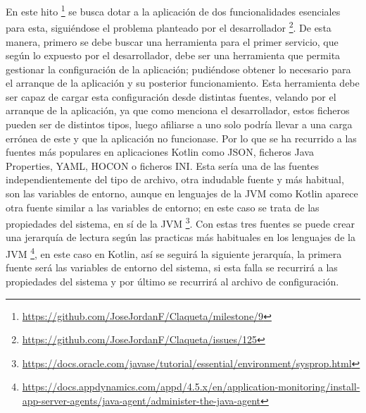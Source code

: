 En este hito \footnote{\url{https://github.com/JoseJordanF/Claqueta/milestone/9}} se busca dotar a la aplicación de
dos funcionalidades esenciales para esta, siguiéndose el problema planteado por el desarrollador 
\footnote{\url{https://github.com/JoseJordanF/Claqueta/issues/125}}. De esta manera, primero se debe buscar una 
herramienta para el primer servicio, que según lo expuesto por el desarrollador, debe ser una herramienta que 
permita gestionar la configuración de la aplicación; pudiéndose obtener lo necesario para el arranque de la aplicación 
y su posterior funcionamiento. Esta herramienta debe ser capaz de cargar esta configuración desde distintas fuentes, 
velando por el arranque de la aplicación, ya que como menciona el desarrollador, estos ficheros pueden ser de 
distintos tipos, luego afiliarse a uno solo podría llevar a una carga errónea de este y que la 
aplicación no funcionase. Por lo que se ha recurrido a las fuentes más populares en aplicaciones Kotlin 
\cite{popularConfig} como JSON\cite{JsonWiki}, ficheros Java Properties\cite{JProWiki}, YAML\cite{YmlWiki}, 
HOCON\cite{HoconWiki} o ficheros INI\cite{IniWiki}. Esta sería una de las fuentes independientemente del tipo de 
archivo, otra indudable fuente y más habitual, son las variables de entorno, aunque en lenguajes de la JVM como 
Kotlin aparece otra fuente similar a las variables de entorno; en este caso se trata de las propiedades
del sistema, en sí de la JVM 
\footnote{\url{https://docs.oracle.com/javase/tutorial/essential/environment/sysprop.html}}. Con estas tres fuentes
se puede crear una jerarquía de lectura según las practicas más habituales en los lenguajes de la JVM 
\footnote{\url{https://docs.appdynamics.com/appd/4.5.x/en/application-monitoring/install-app-server-agents/java-agent/administer-the-java-agent}}, en este caso en Kotlin, así se seguirá la siguiente jerarquía, la primera fuente 
será las variables de entorno del sistema, si esta falla se recurrirá a las propiedades del sistema 
\cite{SecrectsJavaP} y por último se recurrirá al archivo de configuración.

